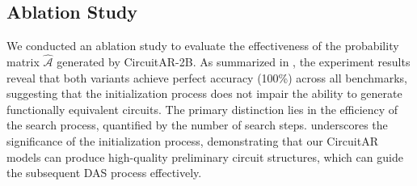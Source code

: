 \subsection{Ablation Study}
\begin{table}[tb!]
\centering
\caption{Ablation study on the initialization process with edge probability generated by CircuitAR-2B.}
\label{table:abinit}
\vskip 0.05in
\footnotesize
{}
\end{table}

We conducted an ablation study to evaluate the effectiveness of the probability matrix $\hat{\mathcal{A}}$ generated by CircuitAR-2B. 
As summarized in , the experiment results reveal that both variants achieve perfect accuracy (100\%) across all benchmarks, suggesting that the initialization process does not impair the ability to generate functionally equivalent circuits. 
The primary distinction lies in the efficiency of the search process, quantified by the number of search steps. 
 underscores the significance of the initialization process, demonstrating that our CircuitAR models can produce high-quality preliminary circuit structures, which can guide the subsequent DAS process effectively.



